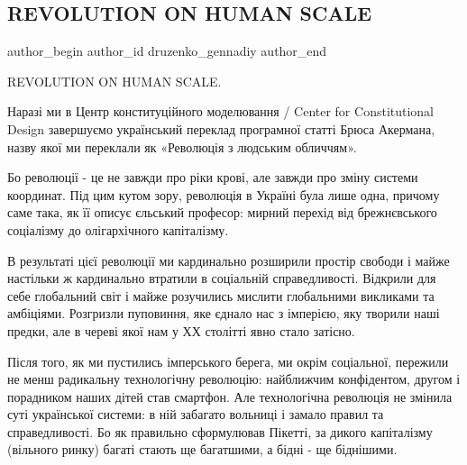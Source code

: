  
 
 
 
 
 
\subsection{REVOLUTION ON HUMAN SCALE}
\label{sec:05_09_2021.fb.druzenko_gennadiy.1.revolution_on_human_scale}
 
\ifcmt
 author_begin
   author_id druzenko_gennadiy
 author_end
\fi

REVOLUTION ON HUMAN SCALE.

Наразі ми в Центр конституційного моделювання / Center for Constitutional
Design завершуємо український переклад програмної статті Брюса Акермана, назву
якої ми переклали як «Революція з людським обличчям». 

Бо революції - це не завжди про ріки крові, але завжди про зміну системи
координат. Під цим кутом зору, революція в Україні була лише одна, причому саме
така, як її описує єльський професор: мирний перехід від брежнєвського
соціалізму до олігархічного капіталізму. 


В результаті цієї революції ми кардинально розширили простір свободи і майже
настільки ж кардинально втратили в соціальній справедливості. Відкрили для себе
глобальний світ і майже розучились мислити глобальними викликами та амбіціями.
Розгризли пуповиння, яке єднало нас з імперією, яку творили наші предки, але в
череві якої нам у ХХ столітті явно стало затісно. 

Після того, як ми пустились імперського берега, ми окрім соціальної, пережили
не менш радикальну технологічну революцію: найближчим конфідентом, другом і
порадником наших дітей став смартфон. Але технологічна революція не змінила
суті української системи: в ній забагато вольниці і замало правил та
справедливості. Бо як правильно сформулював Пікетті, за дикого капіталізму
(вільного ринку) багаті стають ще багатшими, а бідні - ще біднішими. 

